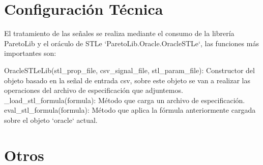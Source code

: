  
\section{Configuración Técnica}
El tratamiento de las señales se realiza mediante el consumo de la librería ParetoLib y el oráculo de STLe `ParetoLib.Oracle.OracleSTLe`, las funciones más importantes son: 
 
OracleSTLeLib(stl_prop_file, csv_signal_file, stl_param_file): Constructor del objeto basado en la señal de entrada csv, sobre este objeto se van a realizar las operaciones del archivo de especificación que adjuntemos. 
_load_stl_formula(formula): Método que carga un archivo de especificación. 
eval_stl_formula(formula): Método que aplica la fórmula anteriormente cargada sobre el objeto `oracle` actual.
 
 
 
 
 
\section{Otros}